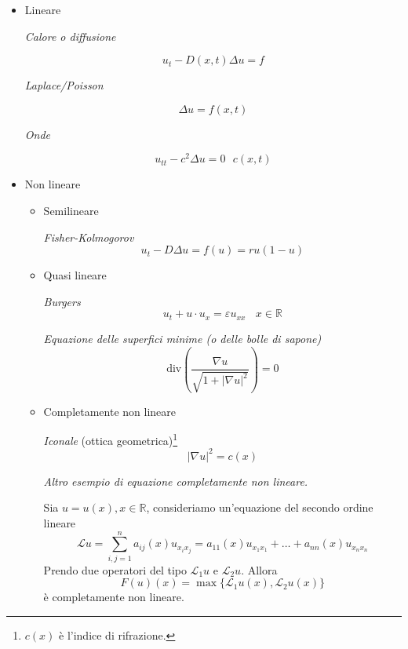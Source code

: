 \documentclass[10pt,a4paper,twoside,openright]{book}
\begin{document}
\begin{itemize}
\item Lineare

\textit{Calore o diffusione}

\begin{equation*}
u_{t} -D(x,t) \Delta u=f
\end{equation*}

\textit{Laplace/Poisson}

\begin{equation*}
\Delta u=f(x,t)
\end{equation*}

\textit{Onde}

\begin{equation*}
u_{tt} -c^{2} \Delta u=0\ \ \ c(x,t)
\end{equation*}
\item Non lineare
\begin{itemize}
\item Semilineare

\textit{Fisher-Kolmogorov}\begin{equation*}
u_{t} -D\Delta u=f(u) =ru(1-u)
\end{equation*}
\item Quasi lineare

\textit{Burgers}\begin{equation*}
u_{t} +u\cdotp u_{x} =\varepsilon u_{xx} \ \ \ \ x\in \mathbb{R}
\end{equation*}

\textit{Equazione delle superfici minime (o delle bolle di sapone)}\begin{equation*}
\mathrm{div}\left(\frac{\nabla u}{\sqrt{1+| \nabla u| ^{2}}}\right) =0
\end{equation*}
\item Completamente non lineare

\textit{Iconale} (ottica geometrica)\footnote{$c(x)$ è l'indice di rifrazione.}\begin{equation*}
| \nabla u| ^{2} =c(x)
\end{equation*}

\textit{Altro esempio di equazione completamente non lineare.}

Sia $u=u(x),x\in \mathbb{R}$, consideriamo un'equazione del secondo ordine lineare\begin{equation*}
\mathcal{L} u=\sum ^{n}_{i,j=1} a_{ij}(x) u_{x_{i} x_{j}} =a_{11}(x) u_{x_{1} x_{1}} +\dotsc +a_{nn}(x) u_{x_{n} x_{n}}
\end{equation*}Prendo due operatori del tipo $\mathcal{L}_{1} u$ e $\mathcal{L}_{2} u$. Allora\begin{equation*}
F(u)(x) =\max\{\mathcal{L}_{1} u(x),\mathcal{L}_{2} u(x)\}
\end{equation*}è completamente non lineare.
\end{itemize}
\end{itemize}
\end{document}
